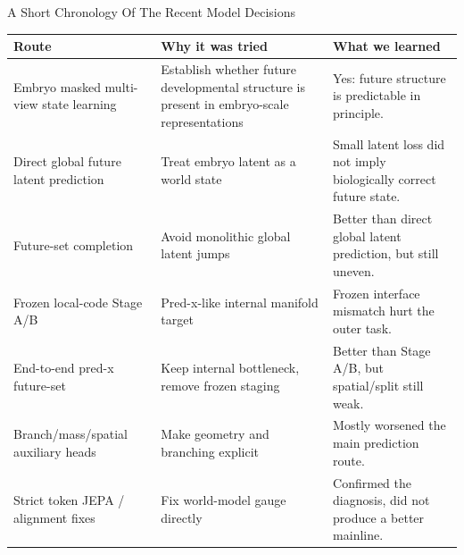 \documentclass[aspectratio=169,11pt]{beamer}
\begin{document}
\begin{frame}[shrink=8]{A Short Chronology Of The Recent Model Decisions}
\footnotesize
\begin{tabular}{>{\raggedright\arraybackslash}p{} >{\raggedright\arraybackslash}p{} >{\raggedright\arraybackslash}p{}}
\toprule
\textbf{Route} & \textbf{Why it was tried} & \textbf{What we learned} \\
\midrule
Embryo masked multi-view state learning & Establish whether future developmental structure is present in embryo-scale representations & Yes: future structure is predictable in principle. \\
\addlinespace[0.3em]
Direct global future latent prediction & Treat embryo latent as a world state & Small latent loss did not imply biologically correct future state. \\
\addlinespace[0.3em]
Future-set completion & Avoid monolithic global latent jumps & Better than direct global latent prediction, but still uneven. \\
\addlinespace[0.3em]
Frozen local-code Stage A/B & Pred-x-like internal manifold target & Frozen interface mismatch hurt the outer task. \\
\addlinespace[0.3em]
End-to-end pred-x future-set & Keep internal bottleneck, remove frozen staging & Better than Stage A/B, but spatial/split still weak. \\
\addlinespace[0.3em]
Branch/mass/spatial auxiliary heads & Make geometry and branching explicit & Mostly worsened the main prediction route. \\
\addlinespace[0.3em]
Strict token JEPA / alignment fixes & Fix world-model gauge directly & Confirmed the diagnosis, did not produce a better mainline. \\
\bottomrule
\end{tabular}
\end{frame}
\end{document}

